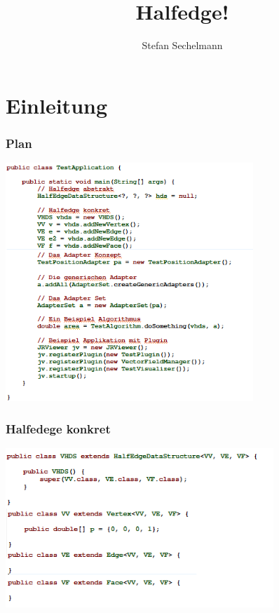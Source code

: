 \documentclass[12pt]{beamer}
\title{\vspace{-1cm}Halfedge!}
\subtitle{}
\author{Stefan Sechelmann}
\date
\begin{document}
\maketitle





\section{Einleitung}

\begin{frame}
\frametitle{Plan}
\begin{center}
\includegraphics[height=9cm]{outline.png}\\	
\end{center}
\end{frame}

\begin{frame}
\frametitle{Halfedege konkret}
\begin{center}
\includegraphics[height=6cm]{Vhalfedge.png}\\	
\end{center}
\end{frame}
\end{document}
